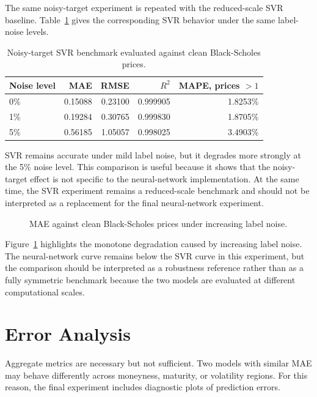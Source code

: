 The same noisy-target experiment is repeated with the reduced-scale SVR baseline.
Table~\ref{tab:noisy-svr-targets} gives the corresponding SVR behavior under the same label-noise levels.

\begin{table}[H]
    \centering
    \begin{tabular}{lrrrr}
        \toprule
        Noise level & MAE     & RMSE    & $R^2$    & MAPE, prices $> 1$ \\
        \midrule
        0\%         & 0.15088 & 0.23100 & 0.999905 & 1.8253\%           \\
        1\%         & 0.19284 & 0.30765 & 0.999830 & 1.8705\%           \\
        5\%         & 0.56185 & 1.05057 & 0.998025 & 3.4903\%           \\
        \bottomrule
    \end{tabular}
    \caption{Noisy-target SVR benchmark evaluated against clean Black-Scholes prices.}
    \label{tab:noisy-svr-targets}
\end{table}

SVR remains accurate under mild label noise, but it degrades more strongly at the 5\% noise level.
This comparison is useful because it shows that the noisy-target effect is not specific to the neural-network implementation.
At the same time, the SVR experiment remains a reduced-scale benchmark and should not be interpreted as a replacement for the final neural-network experiment.

\begin{figure}[H]
    \centering
    \caption{MAE against clean Black-Scholes prices under increasing label noise.}
    \label{fig:noisy-target-robustness}
\end{figure}

Figure~\ref{fig:noisy-target-robustness} highlights the monotone degradation caused by increasing label noise.
The neural-network curve remains below the SVR curve in this experiment, but the comparison should be interpreted as a robustness reference rather than as a fully symmetric benchmark because the two models are evaluated at different computational scales.

\section{Error Analysis}

Aggregate metrics are necessary but not sufficient.
Two models with similar MAE may behave differently across moneyness, maturity, or volatility regions.
For this reason, the final experiment includes diagnostic plots of prediction errors.

